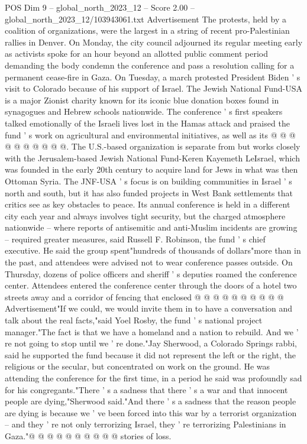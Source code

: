 \begin{textsample}{POS Dim 9 – global\_north\_2023\_12 – Score 2.00 – global\_north\_2023\_12/103943061.txt}
Advertisement The protests, held by a coalition of organizations, were the largest in a string of recent pro-Palestinian rallies in Denver.
On Monday, the city council adjourned its regular meeting early as activists spoke for an hour beyond an allotted public comment period demanding the body condemn the conference and pass a resolution calling for a permanent cease-fire in Gaza.
On Tuesday, a march protested President Biden ' s visit to Colorado because of his support of Israel.
The Jewish National Fund-USA is a major Zionist charity known for its iconic blue donation boxes found in synagogues and Hebrew schools nationwide.
The conference ' s first speakers talked emotionally of the Israeli lives lost in the Hamas attack and praised the fund ' s work on agricultural and environmental initiatives, as well as its @ @ @ @ @ @ @ @ @ @.
The U.S.-based organization is separate from but works closely with the Jerusalem-based Jewish National Fund-Keren Kayemeth LeIsrael, which was founded in the early 20th century to acquire land for Jews in what was then Ottoman Syria.
The JNF-USA ' s focus is on building communities in Israel ' s north and south, but it has also funded projects in West Bank settlements that critics see as key obstacles to peace.
Its annual conference is held in a different city each year and always involves tight security, but the charged atmosphere nationwide -- where reports of antisemitic and anti-Muslim incidents are growing -- required greater measures, said Russell F.
Robinson, the fund ' s chief executive.
He said the group spent"hundreds of thousands of dollars"more than in the past, and attendees were advised not to wear conference passes outside.
On Thursday, dozens of police officers and sheriff ' s deputies roamed the conference center.
Attendees entered the conference center through the doors of a hotel two streets away and a corridor of fencing that enclosed @ @ @ @ @ @ @ @ @ @ Advertisement"If we could, we would invite them in to have a conversation and talk about the real facts,"said Yoel Rosby, the fund ' s national project manager."The fact is that we have a homeland and a nation to rebuild.
And we ' re not going to stop until we ' re done."Jay Sherwood, a Colorado Springs rabbi, said he supported the fund because it did not represent the left or the right, the religious or the secular, but concentrated on work on the ground.
He was attending the conference for the first time, in a period he said was profoundly sad for his congregants."There ' s a sadness that there ' s a war and that innocent people are dying,"Sherwood said."And there ' s a sadness that the reason people are dying is because we ' ve been forced into this war by a terrorist organization -- and they ' re not only terrorizing Israel, they ' re terrorizing Palestinians in Gaza."@ @ @ @ @ @ @ @ @ @ stories of loss.

\end{textsample}
